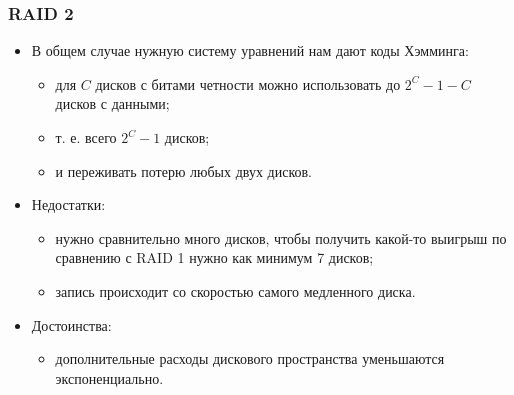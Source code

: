 \begin{frame}
\frametitle{RAID 2}
\begin{itemize}
  \item В общем случае нужную систему уравнений нам дают коды Хэмминга:
  \begin{itemize}
    \item для $C$ дисков с битами четности можно использовать до $2^C - 1 - C$
    дисков с данными;
    \item т. е. всего $2^C - 1$ дисков;
    \item и переживать потерю любых двух дисков.
  \end{itemize}
  \item Недостатки:
  \begin{itemize}
    \item нужно сравнительно много дисков, чтобы получить какой-то выигрыш по
    сравнению с RAID 1 нужно как минимум 7 дисков;
    \item запись происходит со скоростью самого медленного диска.
  \end{itemize}
  \item Достоинства:
  \begin{itemize}
    \item дополнительные расходы дискового пространства уменьшаются
    экспоненциально.
  \end{itemize}
\end{itemize}
\end{frame}
